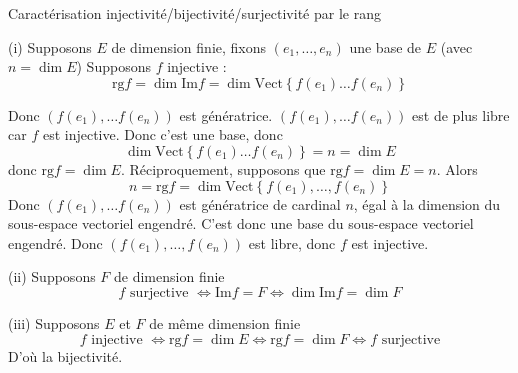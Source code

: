 \documentclass{article}
\date{22 Avril 2024}
\begin{document}
	\maketitle

	
	\begin{question_kholle}[{Soient $E, F$ deux $\mathbb{K}$ espaces vectoriels, $f \in \mathcal{L}_{\mathbb{K}}(E, F)$\\
1. Si $E$ est de dimension finie $$f \text{ injective } \iff \mathrm{rg} f = \dim E$$
2. Si $F$ est de dimension finie$$f \text{ surjective } \iff \mathrm{rg} f = \dim F$$
3. Si $E$ et $F$ sont de même dimension finie $$f \text{ bijective } \iff f \text{ injective } \iff f \text{ sujective }$$}]
		{Caractérisation injectivité/bijectivité/surjectivité par le rang}

(i)
Supposons $E$ de dimension finie, fixons $(e_{1}, \dots, e_{n})$ une base de $E$ (avec $n = \dim E$)
Supposons $f$ injective :
$$
\mathrm{rg} f = \dim \mathrm{Im} f = \dim \text{Vect} \left\{ f(e_{1}) \dots f(e_{n}) \right\}  
$$

Donc $(f(e_{1}), \dots f(e_{n}))$ est génératrice.
$(f(e_{1}), \dots f(e_{n}))$ est de plus libre car $f$ est injective.
Donc c'est une base, donc
$$
\dim \text{Vect} \left\{ f(e_{1}) \dots f(e_{n}) \right\}  =n = \dim E
$$
donc $\mathrm{rg} f = \dim E$.
Réciproquement, supposons que $\mathrm{rg} f = \dim E = n$.
Alors $$n = \mathrm{rg} f = \dim \text{Vect} \left\{ f(e_{1}),\dots,f(e_{n}) \right\}$$
Donc $(f(e_{1}), \dots f(e_{n}))$ est génératrice de cardinal $n$, égal à la dimension du sous-espace vectoriel engendré. C'est donc une base du sous-espace vectoriel engendré.
Donc $(f(e_{1}),\dots , f(e_{n}))$ est libre, donc $f$ est injective.

(ii)
Supposons $F$ de dimension finie
$$
f \text{ surjective } \iff \mathrm{Im} f = F \iff \dim \mathrm{Im} f = \dim F
$$

(iii)
Supposons $E$ et $F$ de même dimension finie
$$
f \text{ injective } \iff \mathrm{rg} f = \dim E \iff \mathrm{rg} f = \dim F \iff f \text{ surjective}
$$
D'où la bijectivité.
	\end{question_kholle}
\end{document}
